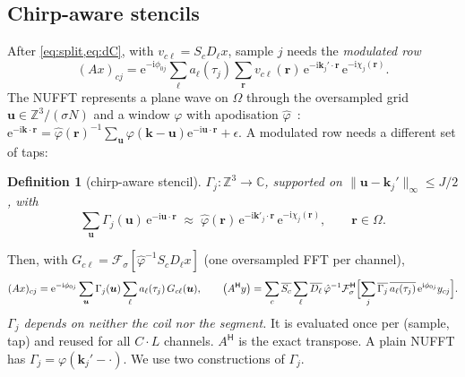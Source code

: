 \documentclass[11pt]{article}
\newtheorem{definition}[proposition]{Definition}
\theoremstyle{remark}
\newcommand{\rr}{\bm r}
\newcommand{\kk}{\bm k}
\newcommand{\uu}{\bm u}
\newcommand{\ii}{\mathrm i}
\newcommand{\ee}{\mathrm e}
\newcommand{\herm}{\mathsf H}
\newcommand{\CC}{\mathbb C}
\newcommand{\ZZ}{\mathbb Z}
\newcommand{\Fs}{\mathcal F_\sigma}
\begin{document}
\subsection{Chirp-aware stencils}
\label{sec:stencil}

After \cref{eq:split,eq:dC}, with $v_{c\ell}=S_cD_\ell x$, sample $j$ needs the \emph{modulated row}
\begin{equation}
  (Ax)_{cj}=\ee^{-\ii\phi_{0j}}\sum_\ell a_\ell(\tau_j)\sum_{\rr}v_{c\ell}(\rr)\,\ee^{-\ii\kk_j'\cdot\rr}\,\ee^{-\ii\chi_j(\rr)} .
  \label{eq:modrow}
\end{equation}
The NUFFT represents a plane wave on $\Omega$ through the oversampled grid $\uu\in\ZZ^3/(\sigma N)$ and a window $\varphi$ with apodisation $\hat\varphi$~\cite{fessler2003,barnett2019}:
$\ee^{-\ii\kk\cdot\rr}=\hat\varphi(\rr)^{-1}\sum_{\uu}\varphi(\kk-\uu)\ee^{-\ii\uu\cdot\rr}+\epsilon$. A modulated row needs a different set of taps:

\begin{definition}[chirp-aware stencil]
\label{def:stencil}
$\Gamma_j:\ZZ^3\to\CC$, supported on $\|\uu-\kk_j'\|_\infty\le J/2$, with
\begin{equation}
  \sum_{\uu}\Gamma_j(\uu)\,\ee^{-\ii\uu\cdot\rr}\;\approx\;\hat\varphi(\rr)\,\ee^{-\ii\kk'_j\cdot\rr}\,\ee^{-\ii\chi_j(\rr)},\qquad\rr\in\Omega .
  \label{eq:stencil}
\end{equation}
\end{definition}
\noindent Then, with $G_{c\ell}=\Fs[\hat\varphi^{-1}S_cD_\ell x]$ (one oversampled FFT per channel),
\begin{equation}
  (Ax)_{cj}=\ee^{-\ii\phi_{0j}}\sum_{\uu}\Gamma_j(\uu)\sum_\ell a_\ell(\tau_j)\,G_{c\ell}(\uu),\qquad
  \bigl(A^\herm y\bigr)=\sum_c\overline{S_c}\sum_\ell\overline{D_\ell}\,\hat\varphi^{-1}\Fs^\herm\Bigl[\sum_j\overline{\Gamma_j}\,\overline{a_\ell(\tau_j)}\,\ee^{\ii\phi_{0j}}y_{cj}\Bigr].
  \label{eq:fwdadj}
\end{equation}
\emph{$\Gamma_j$ depends on neither the coil nor the segment.} It is evaluated once per (sample, tap) and reused for all $C\cdot L$ channels. $A^\herm$ is the exact transpose.
A plain NUFFT has $\Gamma_j=\varphi(\kk_j'-\cdot)$. We use two constructions of $\Gamma_j$.
\end{document}
